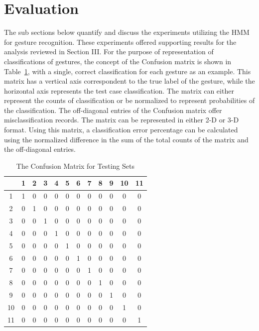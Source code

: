 \documentclass[conference]{IEEEtran}
\newcommand{\TabRef}[1]{Table~\ref{tab:#1}}
\begin{document}
\section{Evaluation}
The sub sections below quantify and discuss the experiments utilizing the HMM for gesture recognition. These experiments offered supporting results for the analysis reviewed in Section III. For the purpose of representation of classifications of gestures, the concept of the Confusion matrix is shown in \TabRef{ConfMatrix}, with a single, correct classification for each gesture as an example. This matrix has a vertical axis correspondent to the true label of the gesture, while the horizontal axis represents the test case classification. The matrix can either represent the counts of classification or be normalized to represent probabilities of the classification. The off-diagonal entries of the Confusion matrix offer misclassification records. The matrix can be represented in either 2-D or 3-D format. Using this matrix, a classification error percentage can be calculated using the normalized difference in the sum of the total counts of the matrix and the off-diagonal entries.


\begin{table}[h]
\renewcommand{\arraystretch}{1.2}
\caption{The Confusion Matrix for Testing Sets}
\label{tab:ConfMatrix}
\centering
\begin{tabular}{c||c|c|c|c|c|c|c|c|c|c|c}
\hline
    \hline
      & 1 & 2 & 3 & 4 & 5 & 6 & 7 & 8 & 9 & 10 & 11\\
    \hline    \hline
    1 & 1 & 0 & 0 & 0 & 0 & 0 & 0 & 0 & 0 & 0 & 0\\
    \hline
    2 & 0 & 1 & 0 & 0 & 0 & 0 & 0 & 0 & 0 & 0 & 0\\
    \hline
    3 & 0 & 0 & 1 & 0 & 0 & 0 & 0 & 0 & 0 & 0 & 0\\
    \hline
    4 & 0 & 0 & 0 & 1 & 0 & 0 & 0 & 0 & 0 & 0 & 0\\
    \hline
    5 & 0 & 0 & 0 & 0 & 1 & 0 & 0 & 0 & 0 & 0 & 0\\
    \hline
    6 & 0 & 0 & 0 & 0 & 0 & 1 & 0 & 0 & 0 & 0 & 0\\
    \hline
    7 & 0 & 0 & 0 & 0 & 0 & 0 & 1 & 0 & 0 & 0 & 0\\
    \hline
    8 & 0 & 0 & 0 & 0 & 0 & 0 & 0 & 1 & 0 & 0 & 0\\
    \hline
    9 & 0 & 0 & 0 & 0 & 0 & 0 & 0 & 0 & 1 & 0 & 0\\
    \hline
    10 & 0 & 0 & 0 & 0 & 0 & 0 & 0 & 0 & 0 & 1 & 0\\
    \hline
    11 & 0 & 0 & 0 & 0 & 0 & 0 & 0 & 0 & 0 & 0 & 1\\
    \hline    \hline
\end{tabular}
\end{table}
\end{document}
